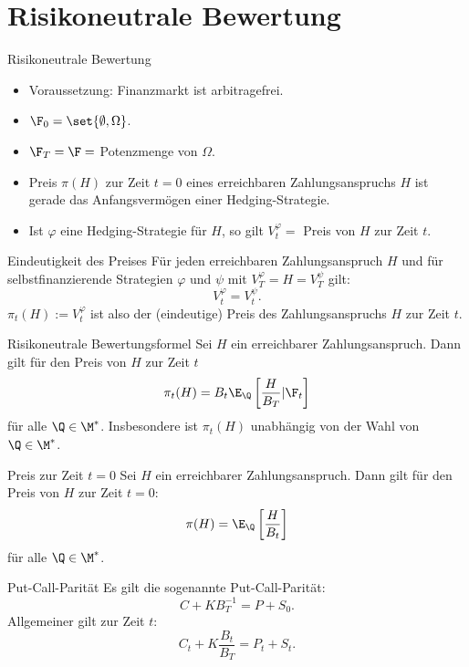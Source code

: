 \section{Risikoneutrale Bewertung}

\begin{karte}{Risikoneutrale Bewertung}
\begin{itemize}
    \item Voraussetzung: Finanzmarkt ist arbitragefrei.
    \item \(\F_0 = \set{\emptyset, \Omega}\).
    \item \(\F_T = \F =\) Potenzmenge von \(\Omega\).
    \item Preis \(\pi(H)\) zur Zeit \(t=0\) eines erreichbaren Zahlungsanspruchs \(H\) 
    ist gerade das Anfangsvermögen einer Hedging-Strategie. 
    \item Ist \(\varphi\) eine Hedging-Strategie für \(H\), so gilt 
    \(V_t^\varphi=\) Preis von \(H\) zur Zeit \(t\).
\end{itemize}
\end{karte}

\begin{karte}{Eindeutigkeit des Preises}
Für jeden erreichbaren Zahlungsanspruch \(H\) 
und für selbstfinanzierende Strategien \(\varphi\) und \(\psi\) 
mit \(V_T^\varphi = H = V_T^\psi\) gilt: 
\[ V_t^\varphi = V_t^\psi. \]
\(\pi_t(H) := V_t^\varphi\) ist also der (eindeutige) Preis des 
Zahlungsanspruchs \(H\) zur Zeit \(t\).
\end{karte}

\begin{karte}{Risikoneutrale Bewertungsformel}
Sei \(H\) ein erreichbarer Zahlungsanspruch. Dann gilt für den Preis von \(H\)
zur Zeit \(t\) 
\[ \pi_t(H) = B_t \E_\Q\left[ \frac{H}{B_T} | \F_t \right] \]
für alle \(\Q\in \M^*\). Insbesondere ist \(\pi_t(H)\) unabhängig von der Wahl von 
\(\Q\in \M^*\).
\end{karte}

\begin{karte}{Preis zur Zeit \(t=0\)}
Sei \(H\) ein erreichbarer Zahlungsanspruch. Dann gilt für den Preis von \(H\)
zur Zeit \(t=0\):
\[ \pi(H) = \E_\Q \left[ \frac{H}{B_t} \right] \]
für alle \(\Q\in\M^*\).
\end{karte}

\begin{karte}{Put-Call-Parität}
Es gilt die sogenannte Put-Call-Parität: 
\[ C + KB_T^{-1} = P + S_0. \]
Allgemeiner gilt zur Zeit \(t\):
\[ C_t + K \frac{B_t}{B_T} = P_t + S_t. \]
\end{karte}

